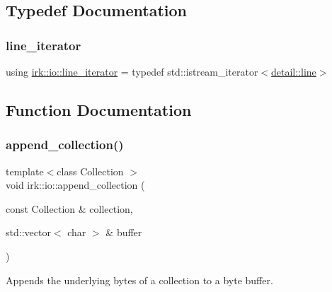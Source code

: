 \subsection{Typedef Documentation}
\mbox{\label{namespaceirk_1_1io_aca7c3fe4077d1c97e51700fbf746d2e5}} 
\subsubsection{\texorpdfstring{line\+\_\+iterator}{line\_iterator}}
{\footnotesize\ttfamily using \mbox{\hyperlink{namespaceirk_1_1io_aca7c3fe4077d1c97e51700fbf746d2e5}{irk\+::io\+::line\+\_\+iterator}} = typedef std\+::istream\+\_\+iterator$<$\mbox{\hyperlink{classirk_1_1io_1_1detail_1_1line}{detail\+::line}}$>$}



\subsection{Function Documentation}
\mbox{\label{namespaceirk_1_1io_ae89e77960d5da14cd0068835eaa3a442}} 
\subsubsection{\texorpdfstring{append\+\_\+collection()}{append\_collection()}}
{\footnotesize\ttfamily template$<$class Collection $>$ \\
void irk\+::io\+::append\+\_\+collection (\begin{DoxyParamCaption}\item[{const Collection \&}]{collection,  }\item[{std\+::vector$<$ char $>$ \&}]{buffer }\end{DoxyParamCaption})}



Appends the underlying bytes of a collection to a byte buffer. 

\mbox{\label{namespaceirk_1_1io_a6b56c2c88f08eba5647f662fe701be3c}} 
